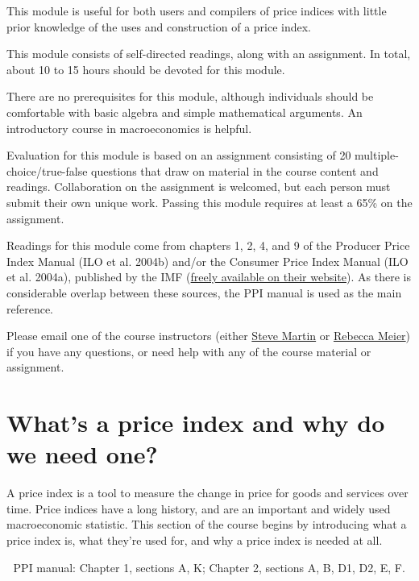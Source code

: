 \documentclass[]{article}
\begin{document}
This module is useful for both users and compilers of price indices with little prior knowledge of the uses and construction of a price index.

This module consists of self-directed readings, along with an assignment. In total, about 10 to 15 hours should be devoted for this module.

There are no prerequisites for this module, although individuals should be comfortable with basic algebra and simple mathematical arguments. An introductory course in macroeconomics is helpful.

Evaluation for this module is based on an assignment consisting of 20 multiple-choice/true-false questions that draw on material in the course content and readings. Collaboration on the assignment is welcomed, but each person must submit their own unique work. Passing this module requires at least a 65\% on the assignment.

Readings for this module come from chapters 1, 2, 4, and 9 of the Producer Price Index Manual (ILO et al. 2004b) and/or the Consumer Price Index Manual (ILO et al. 2004a), published by the IMF (\href{https://www.imf.org/en/Publications/Manuals-Guides/Issues/2016/12/30/Producer-Price-Index-Manual-Theory-and-Practice-16966}{freely available on their website}). As there is considerable overlap between these sources, the PPI manual is used as the main reference.

Please email one of the course instructors (either \href{mailto:steve.martin5@canada.ca}{Steve Martin} or \href{mailto:rebecca.meier@canada.ca}{Rebecca Meier}) if you have any questions, or need help with any of the course material or assignment.

\hypertarget{whats-a-price-index-and-why-do-we-need-one}{%
\section{What's a price index and why do we need one?}\label{whats-a-price-index-and-why-do-we-need-one}}

A price index is a tool to measure the change in price for goods and services over time. Price indices have a long history, and are an important and widely used macroeconomic statistic. This section of the course begins by introducing what a price index is, what they're used for, and why a price index is needed at all.

📖 PPI manual: Chapter 1, sections A, K; Chapter 2, sections A, B, D1, D2, E, F.
\end{document}
